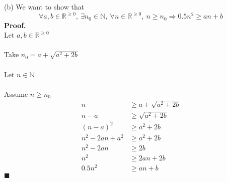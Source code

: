 \documentclass{article}
\newcommand{\R}{\mathbb{R}}
\newcommand{\N}{\mathbb{N}}
\begin{document}
\begin{enumerate}
	(b)  We want to show that $$\forall a,b \in \R^{\geq 0},\ \exists n_0 \in \N ,\ \forall n \in \R^{\geq 0},\ n\geq n_0 \Rightarrow 0.5n^2 \geq an +b$$
	\textbf{Proof.}\\
	Let $a,b\in \R^{\geq 0}$\\\\
	Take $n_0 = a+\sqrt{a^2+2b}$\\\\
	Let $n\in \N$\\\\
	Assume $n\geq n_0$\\
	\begin{align*}
		n &\geq a+\sqrt{a^2+2b} \\
		n-a &\geq \sqrt{a^2+2b} \\
		(n-a)^2 &\geq a^2+2b \\
		n^2 - 2an + a^2 &\geq a^2 + 2b \\
		n^2-2an &\geq 2b \\
		n^2 &\geq 2an +2b \\
		0.5n^2 &\geq an+b
	\end{align*}
	\null\hfill $\blacksquare$
\end{enumerate}
\end{document}
